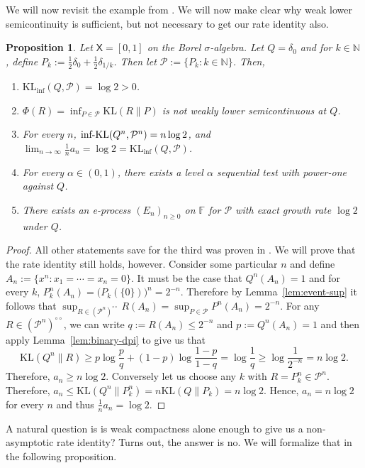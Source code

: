 \documentclass[11pt]{article}
\newcommand{\KL}{\mathrm{KL}}
\newcommand{\KLinf}{\mathrm{KL}_{\mathrm{inf}}}
\newcommand{\infKL}{\textnormal{inf-KL}}
\newcommand{\Pcal}{\mathcal{P}}
\newcommand{\X}{\mathsf{X}}
\newcommand{\bbF}{\mathbb F}
\newtheorem{proposition}[theorem]{Proposition}
\theoremstyle{definition}
\theoremstyle{definition}
\begin{document}
We will now revisit the example from \parencite{ram2026powersequentialtestsexist}. We will now make clear why weak lower semicontinuity is sufficient, but not necessary to get our rate identity also.

\begin{proposition}\label{prop:weaklsc-not-necessary}
Let $\X=[0,1]$ on the Borel $\sigma$-algebra. Let $Q=\delta_0$ and for $k\in\mathbb N$, define $P_k:=\frac12\delta_0 +\frac12\delta_{1/k}$. Then let $\Pcal:=\{P_k:k\in\mathbb N\}$. Then,
\begin{enumerate}
    \item $\KLinf(Q,\Pcal)=\log 2>0$.
    \item $\Phi(R)=\inf_{P\in\Pcal}\KL(R\|P)$ is not weakly lower semicontinuous at $Q$.
    \item For every $n$, $\infKL(Q^n, \Pcal^n)=n\log 2$, and  $\lim_{n\to\infty}\frac1n a_n=\log 2 = \KLinf(Q,\Pcal)$.
    \item For every $\alpha\in(0,1)$, there exists a level $\alpha$ sequential test with power-one against $Q$.
    \item There exists an e-process $(E_n)_{n\ge 0}$ on $\bbF$ for $\Pcal$ with exact growth rate $\log 2$ under $Q$.
\end{enumerate}
\end{proposition}

\begin{proof}
All other statements save for the third was proven in \parencite{ram2026powersequentialtestsexist}. We will prove that the rate identity still holds, however. Consider some particular $n$ and define $A_n:=\{x^n:x_1=\cdots=x_n=0\}$. It must be the case that $Q^n(A_n)=1$ and for every $k$, $P_k^n(A_n)=\bigl(P_k(\{0\})\bigr)^n=2^{-n}$. Therefore by Lemma~\ref{lem:event-sup} it follows that $\sup_{R\in(\Pcal^n)^{\circ\circ}}R(A_n)=\sup_{P\in\Pcal}P^n(A_n)=2^{-n}$. For any $R\in(\Pcal^n)^{\circ\circ}$, we can write $q:=R(A_n)\le 2^{-n}$ and $p:=Q^n(A_n)=1$ and then apply Lemma~\ref{lem:binary-dpi} to give us that
\[
\KL(Q^n\|R)\ge p\log\frac{p}{q}+(1-p)\log\frac{1-p}{1-q} =\log\frac{1}{q}\ge \log\frac{1}{2^{-n}}=n\log 2.
\]
Therefore, $a_n\ge n\log 2$. Conversely let us choose any $k$ with $R=P_k^n\in\Pcal^n$. Therefore, $a_n\le \KL(Q^n\|P_k^n)=n\KL(Q\|P_k)=n\log 2$. Hence, $a_n=n\log 2$ for every $n$ and thus $\frac1n a_n=\log 2$.
\end{proof}

A natural question is is weak compactness alone enough to give us a non-asymptotic rate identity? Turns out, the answer is no. We will formalize that in the following proposition.
\end{document}
